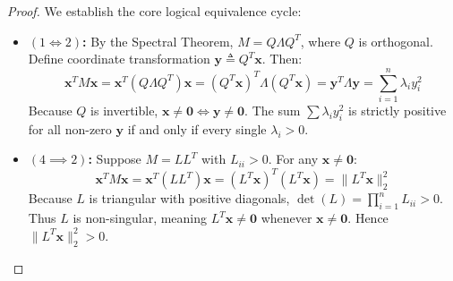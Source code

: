 \begin{proof}
We establish the core logical equivalence cycle:
\begin{itemize}
    \item \textbf{$(1 \iff 2)$:} By the Spectral Theorem, $M = Q \Lambda Q^T$, where $Q$ is orthogonal. Define coordinate transformation $\mathbf{y} \triangleq Q^T \mathbf{x}$. Then:
    \begin{equation}
    \mathbf{x}^T M \mathbf{x} = \mathbf{x}^T (Q \Lambda Q^T) \mathbf{x} = (Q^T \mathbf{x})^T \Lambda (Q^T \mathbf{x}) = \mathbf{y}^T \Lambda \mathbf{y} = \sum_{i=1}^n \lambda_i y_i^2
    \end{equation}
    Because $Q$ is invertible, $\mathbf{x} \ne \mathbf{0} \iff \mathbf{y} \ne \mathbf{0}$. The sum $\sum \lambda_i y_i^2$ is strictly positive for all non-zero $\mathbf{y}$ if and only if every single $\lambda_i > 0$.

    \item \textbf{$(4 \implies 2)$:} Suppose $M = L L^T$ with $L_{ii} > 0$. For any $\mathbf{x} \ne \mathbf{0}$:
    \begin{equation}
    \mathbf{x}^T M \mathbf{x} = \mathbf{x}^T (L L^T) \mathbf{x} = (L^T \mathbf{x})^T (L^T \mathbf{x}) = \|L^T \mathbf{x}\|_2^2
    \end{equation}
    Because $L$ is triangular with positive diagonals, $\det(L) = \prod_{i=1}^n L_{ii} > 0$. Thus $L$ is non-singular, meaning $L^T \mathbf{x} \ne \mathbf{0}$ whenever $\mathbf{x} \ne \mathbf{0}$. Hence $\|L^T \mathbf{x}\|_2^2 > 0$.
\end{itemize}
\end{proof}


